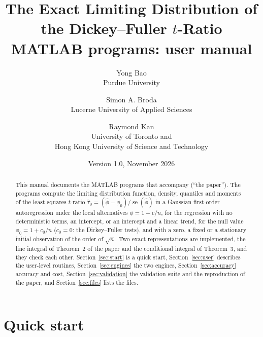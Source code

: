 \documentclass[11pt]{article}
\title{The Exact Limiting Distribution of the Dickey--Fuller $t$-Ratio\\[0.6ex]\large MATLAB programs: user manual}
\author{Yong Bao\\\normalsize Purdue University \and Simon A. Broda\\\normalsize Lucerne University of Applied Sciences \and Raymond Kan\\\normalsize University of Toronto and\\\normalsize Hong Kong University of Science and Technology}
\date{Version 1.0, November 2026}
\newcommand{\phih}{\hat\phi}
\newcommand{\tauh}{\hat\tau}
\begin{document}
\maketitle

\begin{abstract}
\noindent This manual documents the MATLAB programs that accompany \citet*{BaoBrodaKan2026l} (``the paper'').  The programs compute the limiting distribution function, density, quantiles and moments of the least squares $t$-ratio $\tauh_0=(\phih-\phi_0)/\operatorname{se}(\phih)$ in a Gaussian first-order autoregression under the local alternatives $\phi=1+c/n$, for the regression with no deterministic terms, an intercept, or an intercept and a linear trend, for the null value $\phi_0=1+c_0/n$ ($c_0=0$: the Dickey--Fuller tests), and with a zero, a fixed or a stationary initial observation of the order of $\sqrt n$.  Two exact representations are implemented, the line integral of Theorem~2 of the paper and the conditional integral of Theorem~3, and they check each other.  Section~\ref{sec:start} is a quick start, Section~\ref{sec:user} describes the user-level routines, Section~\ref{sec:engines} the two engines, Section~\ref{sec:accuracy} accuracy and cost, Section~\ref{sec:validation} the validation suite and the reproduction of the paper, and Section~\ref{sec:files} lists the files.
\end{abstract}

\tableofcontents

\section{Quick start}
\label{sec:start}
\end{document}
